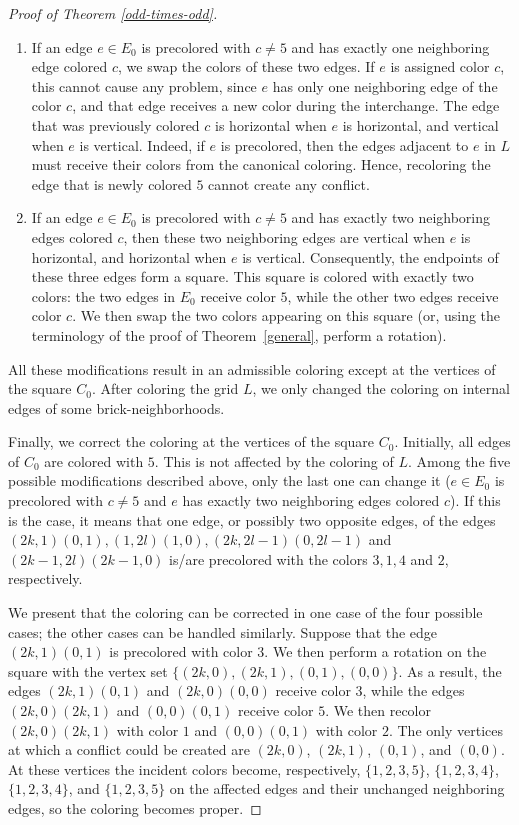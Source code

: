 \documentclass[a4paper,12pt]{article}
\begin{document}
\begin{proof}[Proof of Theorem \ref{odd-times-odd}]
    \begin{enumerate}
        \item If an edge $e \in E_0$ is precolored with $c \neq 5$ and has exactly one neighboring edge colored $c$, we swap the colors of these two edges. If $e$ is assigned color $c$, this cannot cause any problem, since $e$ has only one neighboring edge of the color $c$, and that edge receives a new color during the interchange. The edge that was previously colored $c$ is horizontal when $e$ is horizontal, and vertical when $e$ is vertical. Indeed, if $e$ is precolored, then the edges adjacent to $e$ in $L$ must receive their colors from the canonical coloring. Hence, recoloring the edge that is newly colored $5$ cannot create any conflict.

        \item If an edge $e \in E_0$ is precolored with $c \neq 5$ and has exactly two neighboring edges colored $c$, then these two neighboring edges are vertical when $e$ is horizontal, and horizontal when $e$ is vertical. Consequently, the endpoints of these three edges form a square. This square is colored with exactly two colors: the two edges in $E_0$ receive color $5$, while the other two edges receive color $c$. We then swap the two colors appearing on this square (or, using the terminology of the proof of Theorem~\ref{general}, perform a rotation). 
    \end{enumerate}

    All these modifications result in an admissible coloring except at the vertices of the square $C_0$. After coloring the grid $L$, we only changed the coloring on internal edges of some brick-neighborhoods.

    Finally, we correct the coloring at the vertices of the square $C_0$. Initially, all edges of $C_0$ are colored with $5$. This is not affected by the coloring of $L$. Among the five possible modifications described above, only the last one can change it ($e \in E_0$ is precolored with $c \neq 5$ and $e$ has exactly two neighboring edges colored $c$). If this is the case, it means that one edge, or possibly two opposite edges, of the edges $(2k,1)(0,1), (1,2l)(1,0), (2k,2l-1)(0,2l-1)$ and $(2k-1,2l)(2k-1,0)$ is/are precolored with the colors $3, 1, 4$ and $2$, respectively.

    We present that the coloring can be corrected in one case of the four possible cases; the other cases can be handled similarly. Suppose that the edge $(2k,1)(0,1)$ is precolored with color $3$. We then perform a rotation on the square with the vertex set $\{(2k,0), (2k,1), (0,1), (0,0)\}$. As a result, the edges $(2k,1)(0,1)$ and $(2k,0)(0,0)$ receive color $3$, while the edges $(2k,0)(2k,1)$ and $(0,0)(0,1)$ receive color $5$. We then recolor $(2k,0)(2k,1)$ with color $1$ and $(0,0)(0,1)$ with color $2$. The only vertices at which a conflict could be created are $(2k,0)$, $(2k,1)$, $(0,1)$, and $(0,0)$. At these vertices the incident colors become, respectively, $\{1,2,3,5\}$, $\{1,2,3,4\}$, $\{1,2,3,4\}$, and $\{1,2,3,5\}$ on the affected edges and their unchanged neighboring edges, so the coloring becomes proper.


\end{proof}
\end{document}
